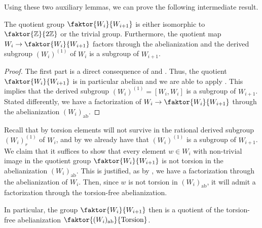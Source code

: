 Using these two auxiliary lemmas, we can prove the following intermediate result.

\begin{proposition}\label{prop:factorization}
    The quotient group \(\faktor{W_{i}}{W_{i+1}}\) is either isomorphic to \(\faktor{\Z}{2\Z}\) or the trivial group.
    Furthermore, the quotient map \(W_i \to \faktor{W_i}{W_{i+1}}\) factors through the abelianization and the derived subgroup \((W_i)^{(1)}\) of \(W_i\) is a subgroup of \(W_{i+1}\).
\end{proposition}
\begin{proof}
    The first part is a direct consequence of  and .
    Thus, the quotient \(\faktor{W_i}{W_{i+1}}\) is in particular abelian and we are able to apply .
    This implies that the derived subgroup \((W_i)^{(1)} = [W_i, W_i]\) is a subgroup of \(W_{i+1}\).
    Stated differently, we have a factorization of \(W_i \to \faktor{W_i}{W_{i+1}}\) through the abelianization \((W_i)_{\text{ab}}\).
\end{proof}
\newpage

\begin{remark}\label{rmk:factorization}
    Recall that by  torsion elements will not survive in the rational derived subgroup \((W_i)_r^{(1)}\) of \(W_i\), and by  we already have that \((W_i)^{(1)}\) is a subgroup of \(W_{i+1}\).
    We claim that it suffices to show that every element \(w \in W_i\) with non-trivial image in the quotient group \(\faktor{W_i}{W_{i+1}}\) is not torsion in the abelianization \((W_i)_{\text{ab}}\).
    This is justified, as by , we have a factorization through the abelianization of \(W_i\).
    Then, since \(w\) is not torsion in \((W_i)_{\text{ab}}\), it will admit a factorization through the torsion-free abelianization.
    \begin{figure}[h!]
        \centering
    \end{figure}\vspace*{-1\parskip}
    
    \noindent
    In particular, the group \(\faktor{W_i}{W_{i+1}}\) then is a quotient of the torsion-free abelianization \(\faktor{(W_i)_{\text{ab}}}{\text{Torsion}}\).
\end{remark}

